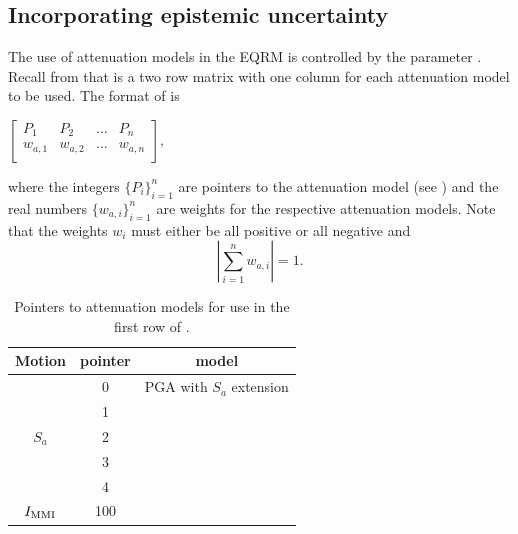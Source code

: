 \subsection{Incorporating
epistemic uncertainty} \label{sec:attn-multi-attnmodels}

The use of attenuation models in the EQRM is controlled by the
 parameter .
Recall from  that
 is a two row matrix with one column
for each attenuation model to be used. The format of
 is
\begin{center}
\begin{math}
 \left[ \begin{array}{ccccc}
P_1 & P_2 &  \hdots & P_n \\
w_{a,1} & w_{a,2} &  \hdots & w_{a,n} \\
\end{array} \right],
\end{math}
\end{center}
where the integers $\{P_i\}_{i=1}^n$ are pointers to the attenuation
model (see ) and the real numbers
$\{w_{a,i}\}_{i=1}^n$ are weights for the respective attenuation
models. Note that the weights $w_i$ must either be all positive or
all negative and
\begin{equation}
\left|\sum_{i=1}^{n}w_{a,i}\right| = 1.
\end{equation}
\begin{table}
\caption{Pointers to attenuation models for use in the first row of
.} \vspace{0.8em}
\label{tab:attn-flags}
\begin{center}
\begin{tabular}{|c|c|c|}
\hline \textbf{Motion} & \textbf{pointer} & \textbf{model} \\
\hline
 & 0 & \cite{dr_Gaull90a} PGA with $S_a$ extension\\
 & 1 & \cite{dr_Toro97a} \\
$S_a$ & 2 & \cite{dr_Atkinson97a} \\
 & 3 & \cite{dr_Sadigh97a} \\
 & 4 & \cite{dr_Somerville01a} \\
\hline
 $\Imm$ & 100 & \cite{dr_Gaull90a} \\
\hline
\end{tabular}
\end{center}
\end{table}

